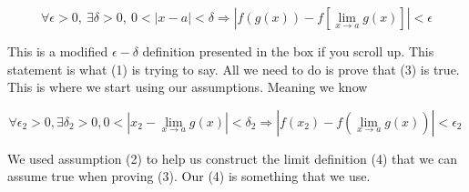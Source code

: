 \documentclass[12pt]{article}
\theoremstyle{plain}
\theoremstyle{remark}
\theoremstyle{definition}
\begin{document}
\[\forall\epsilon > 0,\ \exists\delta > 0,\ 0 < |x - a| < \delta \Rightarrow \left| f\left( g(x) \right) - f\left\lbrack \lim_{x \rightarrow a}{g(x)} \right\rbrack \right| < \epsilon  \]

This is a modified \(\epsilon - \delta\) definition presented in the box
if you scroll up. This statement is what (1) is trying to say. All we
need to do is prove that (3) is true. This is where we start using our
assumptions. Meaning we know

\[\forall\epsilon_{2} > 0,\exists\delta_{2} > 0,0 < \left| x_{2} - \lim_{x \rightarrow a}{g(x)} \right| < \delta_{2} \Rightarrow \left| f\left( x_{2} \right) - f\left( \lim_{x \rightarrow a}{g(x)} \right) \right| < \epsilon_{2}\  \]

We used assumption (2) to help us construct the limit definition (4)
that we can assume true when proving (3). Our (4) is something that we
use.
\end{document}
